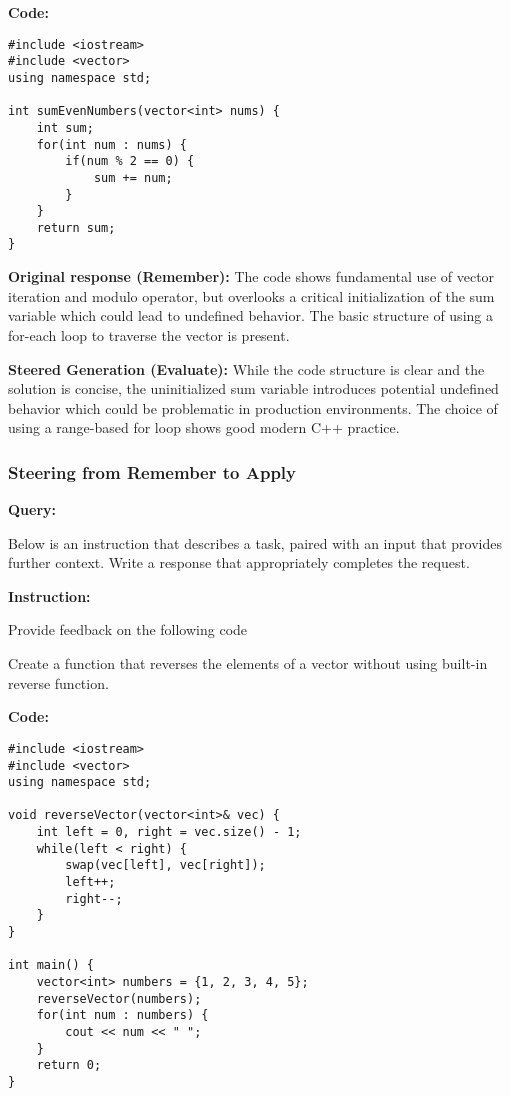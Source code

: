 \textbf{Code:}
\begin{lstlisting}
#include <iostream>
#include <vector>
using namespace std;

int sumEvenNumbers(vector<int> nums) {
    int sum;
    for(int num : nums) {    
        if(num % 2 == 0) {
            sum += num;
        }
    }
    return sum;
}

\end{lstlisting}

{\textbf{Original response (Remember):}  The code shows fundamental use of vector iteration and modulo operator, but overlooks a critical initialization of the sum variable which could lead to undefined behavior. The basic structure of using a for-each loop to traverse the vector is present.}

\textbf{Steered Generation (Evaluate):} While the code structure is clear and the solution is concise, the uninitialized sum variable introduces potential undefined behavior which could be problematic in production environments. The choice of using a range-based for loop shows good modern C++ practice.








\subsubsection*{Steering from Remember to Apply}



\textbf{Query:}\par
Below is an instruction that describes a task, paired with an input that provides further context. Write a response that appropriately completes the request.
\par

\textbf{Instruction:}\par
Provide feedback on the following code\par
Create a function that reverses the elements of a vector without using built-in reverse function.
\par

\textbf{Code:}
\begin{lstlisting}
#include <iostream>
#include <vector>
using namespace std;

void reverseVector(vector<int>& vec) {
    int left = 0, right = vec.size() - 1;
    while(left < right) {
        swap(vec[left], vec[right]);
        left++;
        right--;
    }
}

int main() {
    vector<int> numbers = {1, 2, 3, 4, 5};
    reverseVector(numbers);
    for(int num : numbers) {
        cout << num << " ";
    }
    return 0;
}
\end{lstlisting}

